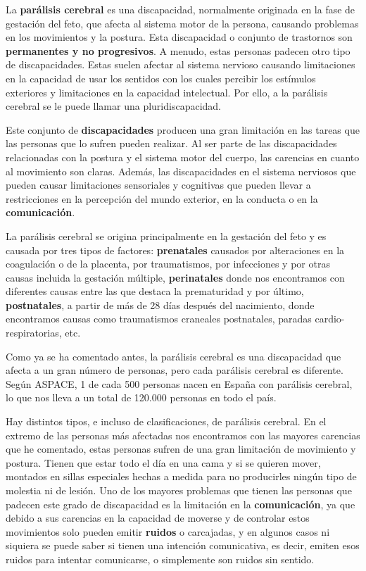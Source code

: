 
La \textbf{parálisis cerebral} es una discapacidad, normalmente originada en la fase de gestación del feto, que afecta al sistema motor de la persona, causando problemas en los movimientos y la postura. Esta discapacidad o conjunto de trastornos son \textbf{permanentes y no progresivos}. A menudo, estas personas padecen otro tipo de discapacidades. Estas suelen afectar al sistema nervioso causando limitaciones en la capacidad de usar los sentidos con los cuales percibir los estímulos exteriores y limitaciones en la capacidad intelectual. Por ello, a la parálisis cerebral se le puede llamar una pluridiscapacidad. \cite{aspacequees,aspacecyl,rosenbaum2007report}

Este conjunto de \textbf{discapacidades} producen una gran limitación en las tareas que las personas que lo sufren pueden realizar. Al ser parte de las discapacidades relacionadas con la postura y el sistema motor del cuerpo, las carencias en cuanto al movimiento son claras. Además, las discapacidades en el sistema nerviosos que pueden causar limitaciones sensoriales y cognitivas que pueden llevar a restricciones en la percepción del mundo exterior, en la conducta o en la \textbf{comunicación}.

La parálisis cerebral se origina principalmente en la gestación del feto y es causada por tres tipos de factores: \textbf{prenatales} causados por alteraciones en la coagulación o de la placenta, por traumatismos, por infecciones y por otras causas incluida la gestación múltiple, \textbf{perinatales} donde nos encontramos con diferentes causas entre las que destaca la prematuridad y por último, \textbf{postnatales}, a partir de más de 28 días después del nacimiento, donde encontramos causas como traumatismos craneales postnatales, paradas cardio-respiratorias, etc.\cite{crene,causas}

Como ya se ha comentado antes, la parálisis cerebral es una discapacidad que afecta a un gran número de personas, pero cada parálisis cerebral es diferente. Según ASPACE, 1 de cada 500 personas nacen en España con parálisis cerebral, lo que nos lleva a un total de 120.000 personas en todo el país.\cite{aspacedatos}

Hay distintos tipos, e incluso de clasificaciones, de parálisis cerebral. En el extremo de las personas más afectadas nos encontramos con las mayores carencias que he comentado, estas personas sufren de una gran limitación de movimiento y postura. Tienen que estar todo el día en una cama y si se quieren mover, montados en sillas especiales hechas a medida para no producirles ningún tipo de molestia ni de lesión. Uno de los mayores problemas que tienen las personas que padecen este grado de discapacidad es la limitación en la \textbf{comunicación}, ya que debido a sus carencias en la capacidad de moverse y de controlar estos movimientos solo pueden emitir \textbf{ruidos} o carcajadas, y en algunos casos ni siquiera se puede saber si tienen una intención comunicativa, es decir, emiten esos ruidos para intentar comunicarse, o simplemente son ruidos sin sentido.

